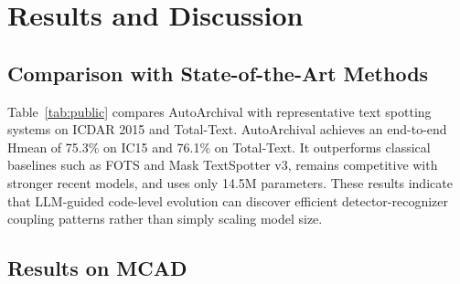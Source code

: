 \documentclass[a4paper,fleqn,longmktitle]{cas-sc}
\begin{document}
\section{Results and Discussion}

\subsection{Comparison with State-of-the-Art Methods}

Table~\ref{tab:public} compares AutoArchival with representative text spotting systems on ICDAR 2015 and Total-Text. AutoArchival achieves an end-to-end Hmean of 75.3\% on IC15 and 76.1\% on Total-Text. It outperforms classical baselines such as FOTS and Mask TextSpotter v3, remains competitive with stronger recent models, and uses only 14.5M parameters. These results indicate that LLM-guided code-level evolution can discover efficient detector-recognizer coupling patterns rather than simply scaling model size.

\begin{table}[t]
\caption{Spotting performance on ICDAR 2015 and Total-Text. ``--'' indicates that standalone recognition metrics were not reported by the original authors under the protocol used here.}
\label{tab:public}
\centering
{}
\end{table}

\subsection{Results on MCAD}
\end{document}
